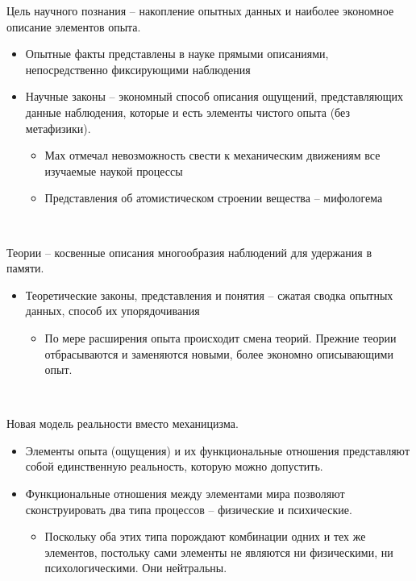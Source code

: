 \documentclass[main.tex]{subfiles}
\begin{document}
{\parindent0pt
Цель научного познания -- накопление опытных данных и наиболее экономное описание элементов опыта.
\begin{itemize}[nosep,leftmargin=0.5cm]
\item Опытные факты представлены в науке прямыми описаниями, непосредственно фиксирующими наблюдения
\item Научные законы -- экономный способ описания ощущений, представляющих данные наблюдения, которые и есть элементы чистого опыта (без метафизики).
\begin{itemize}[nosep,leftmargin=0.6cm]
\item Мах отмечал невозможность свести к механическим движениям все изучаемые наукой процессы
\item Представления об атомистическом строении вещества -- мифологема
\end{itemize}
\end{itemize}
}
\ 

{\parindent0pt
Теории -- косвенные описания многообразия наблюдений для удержания в памяти.
\begin{itemize}[nosep,leftmargin=0.5cm]
\item Теоретические законы, представления и понятия -- сжатая сводка опытных данных, способ их упорядочивания
\begin{itemize}[nosep,leftmargin=0.6cm]
\item По мере расширения опыта происходит смена теорий.
Прежние теории отбрасываются и заменяются новыми, более экономно описывающими опыт.
\end{itemize}
\end{itemize}
}
\ 


{\parindent0pt
Новая модель реальности вместо механицизма.
\begin{itemize}[nosep,leftmargin=0.5cm]
\item Элементы опыта (ощущения) и их функциональные отношения представляют собой единственную реальность, которую можно допустить.
\item Функциональные отношения между элементами мира позволяют сконструировать два типа процессов -- физические и психические.
\begin{itemize}[nosep,leftmargin=0.6cm]
\item Поскольку оба этих типа порождают комбинации одних и тех же элементов, постольку сами элементы не являются ни физическими, ни психологическими.
Они нейтральны.
\end{itemize}
\end{itemize}
}
\end{document}
